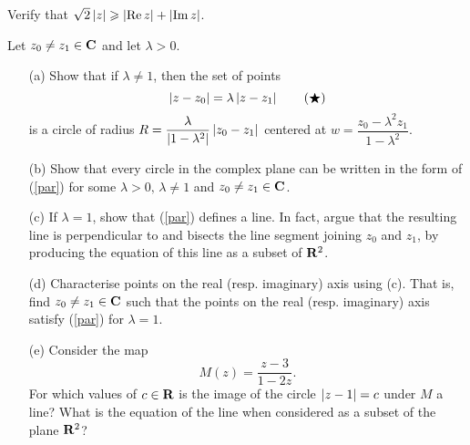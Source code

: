 \vspace*{0.1in}

\begin{problem}\label{prob 1.8}
Verify that $\sqrt{2}\left\lvert z\right\rvert \geqslant \left\lvert\operatorname{Re} z\right\rvert + \left\lvert\operatorname{Im} z\right\rvert$.
\end{problem}

\vspace*{0.1in}

\begin{problem}\label{prob 1.9}
Let $z_0\neq z_1 \in \mathbf C$ and let $\lambda >0$.
\begin{itemize}[itemsep=1em]
\item[(a)] Show that if $\lambda \neq 1$, then the set of points
\begin{equation*}\label{par}
\left\lvert z-z_0\right\rvert = \lambda \left\lvert z-z_1\right\rvert\tag{$\bigstar$}
\end{equation*}
is a circle of radius $R = \dfrac{\lambda}{\left\lvert1-\lambda^2\right\rvert} \left\lvert z_0 - z_1\right\rvert$ centered at $w = \dfrac{z_0 - \lambda^2 z_1}{1-\lambda^2}$.\\[0.5em]
\item[(b)] Show that every circle in the complex plane can be written in the form of (\ref{par}) for some $\lambda >0,\, \lambda \neq 1$ and $z_0 \neq z_1 \in \mathbf C$. 
\item[(c)] If $\lambda = 1$, show that (\ref{par}) defines a line. In fact, argue that the resulting line is perpendicular to and bisects the line segment joining $z_0$ and $z_1$, by producing the equation of this line as a subset of $\mathbf R^2$.
\item[(d)] Characterise points on the real (resp. imaginary) axis using (c). That is, find $z_0 \neq z_1 \in \mathbf C$ such that the points on the real (resp. imaginary) axis satisfy (\ref{par}) for $\lambda = 1$.
\item[(e)] Consider the map \[M(z) = \dfrac{z-3}{1 - 2z}.\] For which values of $c \in \mathbf R$ is the image of the circle $\left\lvert z - 1\right\rvert = c$ under $M$ a line? What is the equation of the line when considered as a subset of the plane $\mathbf R^2$?
\end{itemize}
\end{problem}